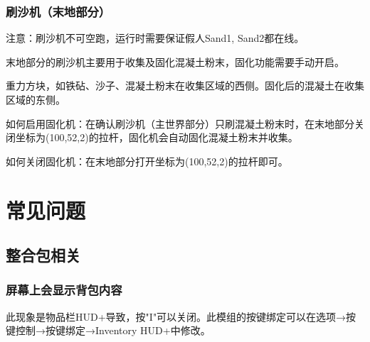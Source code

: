 \documentclass[UTF8,a4paper]{article}
\begin{document}
			\subsubsection{刷沙机（末地部分）}
				\par 注意：刷沙机不可空跑，运行时需要保证假人Sand1, Sand2都在线。
				\par 末地部分的刷沙机主要用于收集及固化混凝土粉末，固化功能需要手动开启。
				\par 重力方块，如铁砧、沙子、混凝土粉末在收集区域的西侧。固化后的混凝土在收集区域的东侧。
				\par 如何启用固化机：在确认刷沙机（主世界部分）只刷混凝土粉末时，在末地部分关闭坐标为(100,52,2)的拉杆，固化机会自动固化混凝土粉末并收集。
				\par 如何关闭固化机：在末地部分打开坐标为(100,52,2)的拉杆即可。
			\subsubsection{}
	\section{常见问题}
		\subsection{整合包相关}
			\subsubsection{屏幕上会显示背包内容}
				\par 此现象是物品栏HUD+导致，按"I"可以关闭。此模组的按键绑定可以在选项→按键控制→按键绑定→Inventory HUD+中修改。
				
\end{document}
